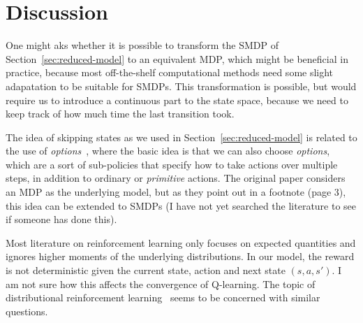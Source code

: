 \documentclass{article}
\theoremstyle{definition}
\theoremstyle{plain}
\begin{document}
\section{Discussion}

One might aks whether it is possible to transform the SMDP of
Section~\ref{sec:reduced-model} to an equivalent MDP, which might be beneficial
in practice, because most off-the-shelf computational methods need some slight
adapatation to be suitable for SMDPs. This transformation is possible, but would
require us to introduce a continuous part to the state space, because we need to
keep track of how much time the last transition took.

The idea of skipping states as we used in Section~\ref{sec:reduced-model} is
related to the use of \textit{options}~\citep{suttonMDPsSemiMDPsFramework1999},
where the basic idea is that we can also choose \textit{options}, which are a
sort of sub-policies that specify how to take actions over multiple steps, in
addition to ordinary or \textit{primitive} actions. The original paper considers
an MDP as the underlying model, but as they point out in a footnote (page 3),
this idea can be extended to SMDPs (I have not yet searched the literature to
see if someone has done this).

Most literature on reinforcement learning only focuses on expected quantities
and ignores higher moments of the underlying distributions. In our model, the
reward is not deterministic given the current state, action and next state
$(s, a, s')$. I am not sure how this affects the convergence of Q-learning. The
topic of distributional reinforcement
learning~\citep{bellemareDistributionalPerspectiveReinforcement2017,bdr2023}
seems to be concerned with similar questions.




\end{document}
